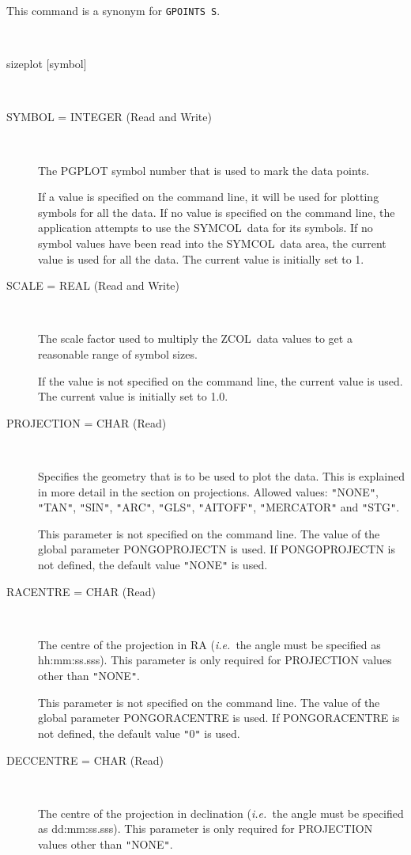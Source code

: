 \documentclass[twoside,11pt]{article}
\newcommand{\htmlref}[2]{#1}
\renewcommand{\_}{\texttt{\symbol{95}}}
\newcommand{\ie}{{\em i.e.\ }}
\newcommand{\zcol}{{\sf ZCOL}}
\newcommand{\symcol}{{\sf SYMCOL}}
\newcommand{\cnam}[1]{{\tt #1}}
\newcommand{\iref} [1]{\htmlref{#1}{#1}}
\newcommand{\sstusage}[1]{\item[Usage:] \mbox{}
\\[1.3ex]{\raggedright \ssttt #1}}
\newcommand{\sstparameters}[1]{
   \item[Parameters:] \mbox{} \\
   \vspace{-3.5ex}
   \begin{description}
      #1
   \end{description}
}
\newcommand{\sstsubsection}[1]{ \item[{#1}] \mbox{} \\}
\newcommand{\sstusage}[1]{\item[Usage:]
      \begin{description}
         {\ssttt #1}
      \end{description}
      \\
   }
\newcommand{\sstparameters}[1]{
      \item[Parameters:] \\
      \begin{description}
         #1
      \end{description}
      \\
   }
\newcommand{\sstsubsection}[1]{\item[{#1}]}
\begin{document}
\begin{sloppypar}
{{      This command is a synonym for \cnam{\iref{GPOINTS} S}.
   }
   \sstusage {
      sizeplot [symbol]
   }
   \sstparameters{
      \sstsubsection{
         SYMBOL = \_INTEGER (Read and Write)
      }{
         The PGPLOT symbol number that is used to mark the data points.

         If a value is specified on the command line, it will be used
         for plotting symbols for all the data. If no value is
         specified on the command line, the application attempts to use
         the \symcol\ data for its symbols. If no symbol values have been
         read into the \symcol\ data area, the current value is used for
         all the data. The current value is initially set to 1.
      }
      \sstsubsection{
         SCALE = \_REAL (Read and Write)
      }{
         The scale factor used to multiply the \zcol\ data values to get
         a reasonable range of symbol sizes.

         If the value is not specified on the command line, the current
         value is used. The current value is initially set to 1.0.
      }
      \sstsubsection{
         PROJECTION = \_CHAR (Read)
      }{
         Specifies the geometry that is to be used to plot the data.
         This is explained in more detail in the section on
         projections.  Allowed values: {\tt "}NONE{\tt "}, {\tt "}TAN{\tt "}, {\tt "}SIN{\tt "}, {\tt "}ARC{\tt "},
         {\tt "}GLS{\tt "}, {\tt "}AITOFF{\tt "}, {\tt "}MERCATOR{\tt "} and {\tt "}STG{\tt "}.

         This parameter is not specified on the command line. The value
         of the global parameter PONGO\_PROJECTN is used. If
         PONGO\_PROJECTN is not defined, the default value {\tt "}NONE{\tt "} is
         used.
      }
      \sstsubsection{
         RACENTRE = \_CHAR (Read)
      }{
         The centre of the projection in RA (\ie the angle must be
         specified as hh:mm:ss.sss). This parameter is only required for
         PROJECTION values other than {\tt "}NONE{\tt "}.

         This parameter is not specified on the command line. The value
         of the global parameter PONGO\_RACENTRE is used. If
         PONGO\_RACENTRE is not defined, the default value {\tt "}0{\tt "} is used.
      }
      \sstsubsection{
         DECCENTRE = \_CHAR (Read)
      }{
         The centre of the projection in declination (\ie the angle
         must be specified as dd:mm:ss.sss). This parameter is only
         required for PROJECTION values other than {\tt "}NONE{\tt "}.

}}}
\end{sloppypar}
\end{document}
